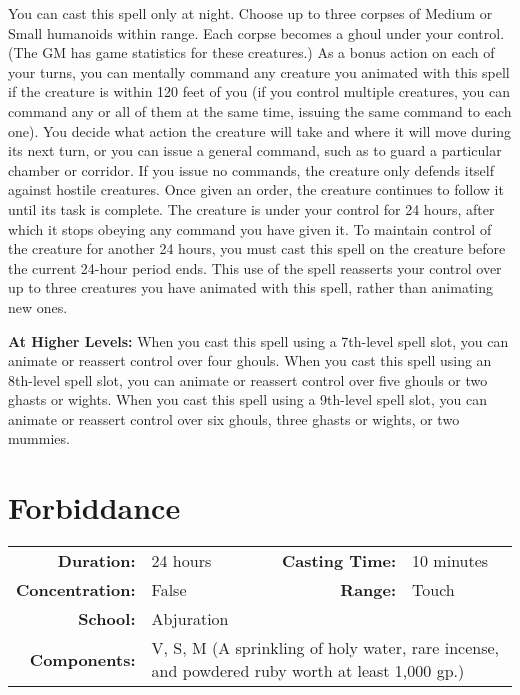 \documentclass[a5paper, 12pt]{memoir}
\begin{document}
\vspace{1\baselineskip}\noindent You can cast this spell only at night. Choose up to three corpses of Medium or Small humanoids within range. Each corpse becomes a ghoul under your control. (The GM has game statistics for these creatures.) As a bonus action on each of your turns, you can mentally command any creature you animated with this spell if the creature is within 120 feet of you (if you control multiple creatures, you can command any or all of them at the same time, issuing the same command to each one). You decide what action the creature will take and where it will move during its next turn, or you can issue a general command, such as to guard a particular chamber or corridor. If you issue no commands, the creature only defends itself against hostile creatures. Once given an order, the creature continues to follow it until its task is complete. The creature is under your control for 24 hours, after which it stops obeying any command you have given it. To maintain control of the creature for another 24 hours, you must cast this spell on the creature before the current 24-hour period ends. This use of the spell reasserts your control over up to three creatures you have animated with this spell, rather than animating new ones.

\vspace{8pt} \noindent\textbf{At Higher Levels:} When you cast this spell using a 7th-level spell slot, you can animate or reassert control over four ghouls. When you cast this spell using an 8th-level spell slot, you can animate or reassert control over five ghouls or two ghasts or wights. When you cast this spell using a 9th-level spell slot, you can animate or reassert control over six ghouls, three ghasts or wights, or two mummies.
\newpage
\section*{Forbiddance}

{
\small\centering\vspace{-6pt}
\begin{tabular}{rlrl}
\toprule

\textbf{Duration:} & 24 hours &
\textbf{Casting Time:} & 10 minutes \\
\textbf{Concentration:} & False &
\textbf{Range:} & Touch \\
\textbf{School:} & Abjuration \\
\textbf{Components:} & \multicolumn{3}{p{0.7\textwidth}}{V, S, M (A sprinkling of holy water, rare incense, and powdered ruby worth at least 1,000 gp.)}\\

\bottomrule
\end{tabular}
}
\end{document}

